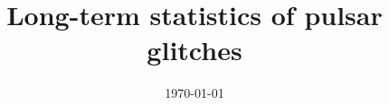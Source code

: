 \documentclass[a4paper,12pt]{report}
\institute{UniTs - University of Trieste}
\title{Long-term statistics of pulsar glitches}
\date{\today}
\begin{document}
\maketitle



\toc



\printbibliography
\end{document}

